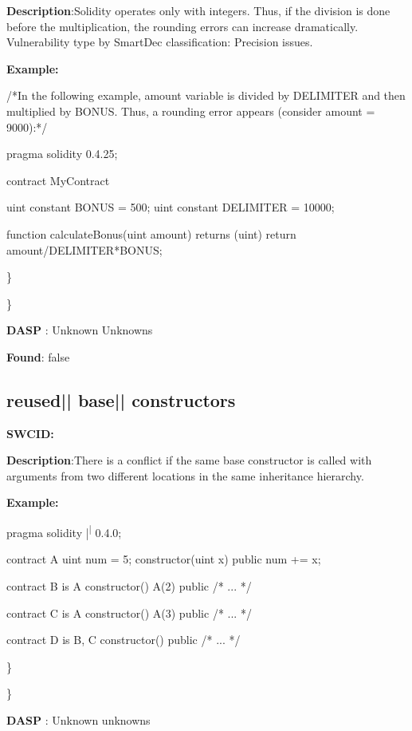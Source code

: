 \documentclass{article}
\begin{document}
\textbf{Description}:Solidity operates only with integers. Thus, if the division is done before the multiplication, the rounding errors can increase dramatically. Vulnerability type by SmartDec classification: Precision issues.


\textbf{Example:} 
\begin{ffcode} 

/*In the following example, amount variable is divided by DELIMITER and then multiplied by BONUS. Thus, a rounding error appears (consider amount = 9000):*/ 

pragma solidity 0.4.25;

contract MyContract {

    uint constant BONUS = 500;
    uint constant DELIMITER = 10000;

    function calculateBonus(uint amount) returns (uint) {
        return amount/DELIMITER*BONUS;
    }
}

\end{ffcode} 
\} 

\} 

\textbf{DASP} : Unknown Unknowns

\textbf{Found}: false

\subsection{reused{|\textunderscore| }base{|\textunderscore| }constructors} 
\textbf{SWC{\textunderscore }ID:} 

\textbf{Description}:There is a conflict if the same base constructor is called with arguments from two different locations in the same inheritance hierarchy.


\textbf{Example:} 
\begin{ffcode} 

pragma solidity |\textsuperscript| 0.4.0;

contract A{
    uint num = 5;
    constructor(uint x) public{
        num += x;
    }
}

contract B is A{
    constructor() A(2) public { /* ... */ }
}

contract C is A {
    constructor() A(3) public { /* ... */ }
}

contract D is B, C {
    constructor() public { /* ... */ }
}

\end{ffcode} 
\} 

\} 

\textbf{DASP} : Unknown unknowns
\end{document}
